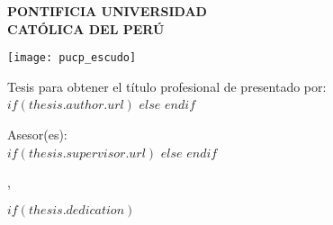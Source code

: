 \pagestyle{empty} %

\begin{titlepage}
\begin{center}

{\MakeUppercase{\textbf{PONTIFICIA UNIVERSIDAD \\ CATÓLICA DEL PERÚ}}\par}\vspace{0.25cm} %
\MakeUppercase{\textbf{\facname}}\vspace{0.5cm} %

\texttt{[image: pucp\_escudo]}\vspace{0.5cm}

{\textbf{\ttitle}\par}\vspace{0.4cm} %

{Tesis para obtener el título profesional de \degreename}{ presentado por:}\\[0.3cm] %

$if(thesis.author.url)$
\href{$thesis.author.url$}{\authorname} %
$else$
\authorname
$endif$

{Asesor(es):}\\[0.4cm]
$if(thesis.supervisor.url)$%
\href{$thesis.supervisor.url$}{\supname} %
$else$%
\supname
$endif$

{\cityname}{, }{\dateyearname}

\vfill
\end{center}
\end{titlepage}

$if(thesis.dedication)$

\dedicatory{} 
\newpage

